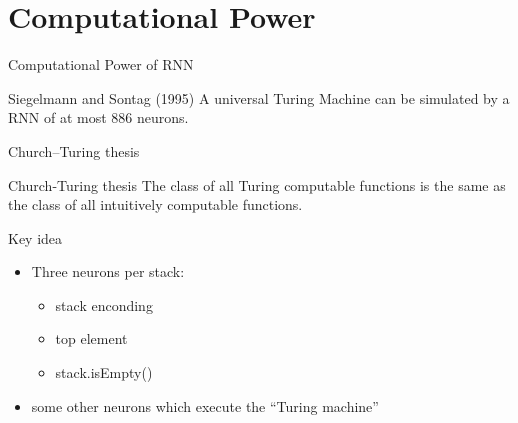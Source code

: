\section{Computational Power}
\begin{frame}
\sectionpage
\end{frame}

\begin{frame}{Computational Power of RNN}
\begin{alertblock}{Siegelmann and Sontag (1995) \cite{SiSo95}}
A universal Turing Machine can be simulated by a RNN of at most 886 neurons.
\end{alertblock}
\end{frame}

\begin{frame}{Church–Turing thesis}
\begin{overlayarea}{\textwidth}{4cm}
\end{overlayarea}
\begin{block}{Church-Turing thesis}
The class of all Turing computable functions is the same as the class of all intuitively computable functions.\\
\end{block}
\end{frame}


\begin{frame}{Key idea}
\begin{itemize}
\item Three neurons per stack:
\begin{itemize}
\item stack enconding
\item top element
\item stack.isEmpty()
\end{itemize}
\item some other neurons which execute the ``Turing machine''
\end{itemize}
\end{frame}

